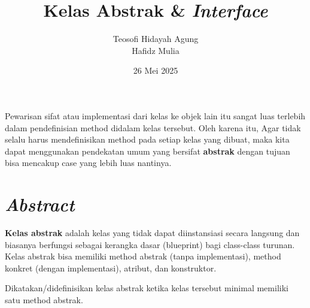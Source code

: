 \documentclass{../praktikum-ppt}
\author[Tew \& Haf]{Teosofi Hidayah Agung \\ Hafidz Mulia}
\date{26 Mei 2025}
\title[Alpro 2 - Week 9]{Kelas Abstrak \& \textit{Interface}}
\institute[Matematika ITS]{Departemen Matematika\\ Institut Teknologi Sepuluh Nopember}
\begin{document}
{
\begin{frame}
  \titlepage
\end{frame}
}


\begin{frame}
  \begin{masalah}
    Pewarisan sifat atau implementasi dari kelas ke objek lain itu sangat luas terlebih dalam pendefinisian method didalam kelas tersebut. Oleh karena itu, Agar tidak selalu harus mendefinisikan method pada setiap kelas yang dibuat, maka kita dapat menggunakan pendekatan umum yang bersifat \textbf{abstrak} dengan tujuan bisa mencakup case yang lebih luas nantinya.
  \end{masalah}
\end{frame}

\section{\textit{Abstract}}
\begin{frame}{\insertsection}
  \begin{definisi}
    \textbf{Kelas abstrak} adalah kelas yang tidak dapat diinstansiasi secara langsung dan biasanya berfungsi sebagai kerangka dasar (blueprint) bagi class-class turunan. Kelas abstrak bisa memiliki method abstrak (tanpa implementasi), method konkret (dengan implementasi), atribut, dan konstruktor.
  \end{definisi}
  Dikatakan/didefinisikan kelas abstrak ketika kelas tersebut minimal memiliki satu method abstrak.  
\end{frame}
\end{document}
